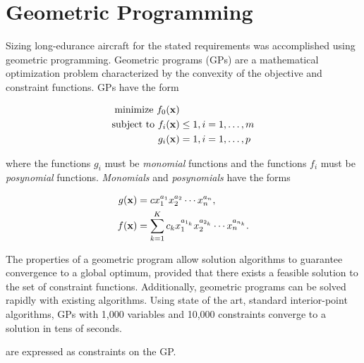 \DIFdelend \section{Geometric Programming}

Sizing long-edurance aircraft for the stated requirements was accomplished using geometric programming. 
Geometric programs (GPs) are a mathematical optimization problem characterized by the convexity of the objective and constraint functions.\cite{gp} GPs have the form

\begin{align} 
\label{e:gpform}
\text{minimize } f_0(\bold{x}) & \nonumber \\
\text{subject to  } f_i(\bold{x}) &\leq 1, i=1,\ldots,m \\
g_i (\bold{x}) &= 1, i = 1,\ldots,p 
\end{align}

where the functions $g_i$ must be \emph{monomial} functions and the functions $f_i$ must be \emph{posynomial} functions. \emph{Monomials} and \emph{posynomials} have the forms

\begin{align}
 \label{e:mon}
g(\bold{x}) &= c x_1^{a_1} x_2^{a_2} \dotsm x_n^{a_n} , \\
\label{e:pos}
f(\bold{x}) &= \displaystyle\sum_{k=1}^K c_k x_1^{a_{1_k}} x_2^{a_{2_k}} \dotsm x_n^{a_{n_k}}.
\end{align}

The properties of a geometric program allow solution algorithms to guarantee convergence to a global optimum, provided that there exists a feasible solution to the set of constraint functions.  
Additionally, geometric programs can be solved rapidly with existing algorithms.  
Using state of the art, standard interior-point algorithms, GPs with 1,000 variables and 10,000 constraints converge to a solution in tens of seconds.\cite{gp}  
\DIFdelbegin {}\DIFdelend \DIFaddbegin 

\DIFaddend are expressed as constraints on the GP.\cite{hoburgthesis} 
\DIFaddbegin {}

